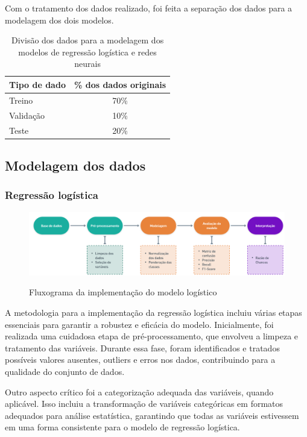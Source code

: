 Com o tratamento dos dados realizado, foi feita a separação dos dados para a modelagem dos dois modelos.


\begin{table}[h]
  \centering
  \begin{tabular}{l|c}
  \hline
  \textbf{Tipo de dado} & \textbf{\% dos dados originais} \\ \hline
  Treino & 70\% \\ 
  Validação & 10\% \\
  Teste & 20\% \\ \hline
  \end{tabular}
  \caption{Divisão dos dados para a modelagem dos modelos de regressão logística e redes neurais}
  \label{table:divisao_dados}
\end{table}



\subsection{Modelagem dos dados}

\subsubsection{Regressão logística}

\begin{figure}[H]
  \centering
  \caption{Fluxograma da implementação do modelo logístico}
  \includegraphics[width=1\textwidth]{imagens/flugrama_logistico.png}
  \label{fig:imagens/flugrama_logistico.png}
\end{figure}

A metodologia para a implementação da regressão logística incluiu várias etapas essenciais para 
garantir a robustez e eficácia do modelo. Inicialmente, foi realizada uma cuidadosa etapa de pré-processamento, 
que envolveu a limpeza e tratamento das variáveis. Durante essa fase, foram identificados e tratados 
possíveis valores ausentes, outliers e erros nos dados, contribuindo para a qualidade do conjunto de dados.

Outro aspecto crítico foi a categorização adequada das variáveis, quando aplicável. Isso incluiu a transformação
de variáveis categóricas em formatos adequados para análise estatística, garantindo que todas as variáveis 
estivessem em uma forma consistente para o modelo de regressão logística.

